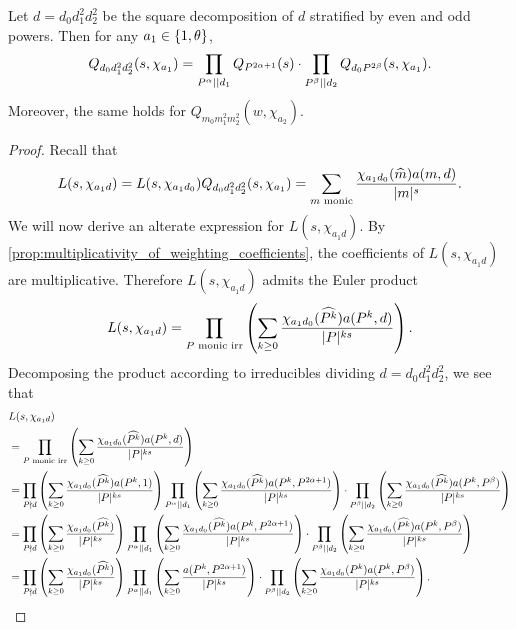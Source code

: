 \documentclass[12pt,reqno,oneside]{amsart}
\begin{document}
    \begin{theorem}\label{thm:correction_polynomial_Euler_product}
        Let $d = d_{0}d_{1}^{2}d_{2}^{2}$ be the square decomposition of $d$ stratified by even and odd powers. Then for any $a_{1} \in \{1,\theta\}$,
        \[
            Q_{d_{0}d_{1}^{2}d_{2}^{2}}(s,\chi_{a_{1}}) = \prod_{P^{\alpha} \mid\mid d_{1}}Q_{P^{2\alpha+1}}(s) \cdot \prod_{P^{\beta} \mid\mid d_{2}}Q_{d_{0}P^{2\beta}}(s,\chi_{a_{1}}).
        \]
        Moreover, the same holds for $Q_{m_{0}m_{1}^{2}m_{2}^{2}}(w,\chi_{a_{2}})$.
    \end{theorem}
    \begin{proof}
        Recall that
        \[
            L(s,\chi_{a_{1}d}) = L(s,\chi_{a_{1}d_{0}})Q_{d_{0}d_{1}^{2}d_{2}^{2}}(s,\chi_{a_{1}}) = \sum_{\text{$m$ monic}}\frac{\chi_{a_{1}d_{0}}(\widehat{m})a(m,d)}{|m|^{s}}.
        \]
        We will now derive an alterate expression for $L(s,\chi_{a_{1}d})$. By \cref{prop:multiplicativity_of_weighting_coefficients}, the coefficients of $L(s,\chi_{a_{1}d})$ are multiplicative. Therefore $L(s,\chi_{a_{1}d})$ admits the Euler product
        \[
            L(s,\chi_{a_{1}d}) = \prod_{\text{$P$ monic irr}}\left(\sum_{k \ge 0}\frac{\chi_{a_{1}d_{0}}(\widehat{P^{k}})a(P^{k},d)}{|P|^{ks}}\right).
        \]
        Decomposing the product according to irreducibles dividing $d = d_{0}d_{1}^{2}d_{2}^{2}$, we see that
        \begin{align*}
            & L(s,\chi_{a_{1}d}) \\
            &= \prod_{\text{$P$ monic irr}}\left(\sum_{k \ge 0}\frac{\chi_{a_{1}d_{0}}(\what{P^{k}})a(P^{k},d)}{|P|^{ks}}\right) \\
            &= \prod_{P \nmid d}\left(\sum_{k \ge 0}\frac{\chi_{a_{1}d_{0}}(\what{P^{k}})a(P^{k},1)}{|P|^{ks}}\right)\prod_{P^{\a} \mid\mid d_{1}}\left(\sum_{k \ge 0}\frac{\chi_{a_{1}d_{0}}(\what{P^{k}})a(P^{k},P^{2\a+1})}{|P|^{ks}}\right) \cdot \prod_{P^{\b} \mid\mid d_{2}}\left(\sum_{k \ge 0}\frac{\chi_{a_{1}d_{0}}(\what{P^{k}})a(P^{k},P^{\b})}{|P|^{ks}}\right) \\
            &= \prod_{P \nmid d}\left(\sum_{k \ge 0}\frac{\chi_{a_{1}d_{0}}(\what{P^{k}})}{|P|^{ks}}\right)\prod_{P^{\a} \mid\mid d_{1}}\left(\sum_{k \ge 0}\frac{\chi_{a_{1}d_{0}}(\what{P^{k}})a(P^{k},P^{2\a+1})}{|P|^{ks}}\right) \cdot \prod_{P^{\b} \mid\mid d_{2}}\left(\sum_{k \ge 0}\frac{\chi_{a_{1}d_{0}}(\what{P^{k}})a(P^{k},P^{\b})}{|P|^{ks}}\right) \\
            &= \prod_{P \nmid d}\left(\sum_{k \ge 0}\frac{\chi_{a_{1}d_{0}}(\what{P^{k}})}{|P|^{ks}}\right)\prod_{P^{\a} \mid\mid d_{1}}\left(\sum_{k \ge 0}\frac{a(P^{k},P^{2\a+1})}{|P|^{ks}}\right) \cdot \prod_{P^{\b} \mid\mid d_{2}}\left(\sum_{k \ge 0}\frac{\chi_{a_{1}d_{0}}(P^{k})a(P^{k},P^{\b})}{|P|^{ks}}\right).

\end{align*}
\end{proof}
\end{document}
